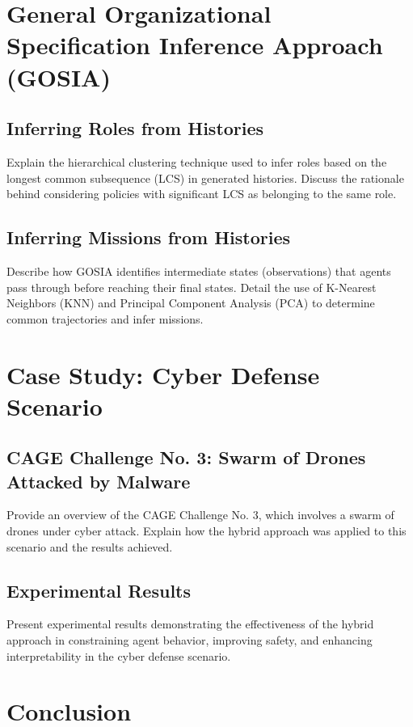 \documentclass[runningheads]{llncs}
\begin{document}
\section{General Organizational Specification Inference Approach (GOSIA)}

\subsection{Inferring Roles from Histories}
Explain the hierarchical clustering technique used to infer roles based on the longest common subsequence (LCS) in generated histories. Discuss the rationale behind considering policies with significant LCS as belonging to the same role.

\subsection{Inferring Missions from Histories}
Describe how GOSIA identifies intermediate states (observations) that agents pass through before reaching their final states. Detail the use of K-Nearest Neighbors (KNN) and Principal Component Analysis (PCA) to determine common trajectories and infer missions.

\section{Case Study: Cyber Defense Scenario}

\subsection{CAGE Challenge No. 3: Swarm of Drones Attacked by Malware}
Provide an overview of the CAGE Challenge No. 3, which involves a swarm of drones under cyber attack. Explain how the hybrid approach was applied to this scenario and the results achieved.

\subsection{Experimental Results}
Present experimental results demonstrating the effectiveness of the hybrid approach in constraining agent behavior, improving safety, and enhancing interpretability in the cyber defense scenario.

\section{Conclusion}
\end{document}
